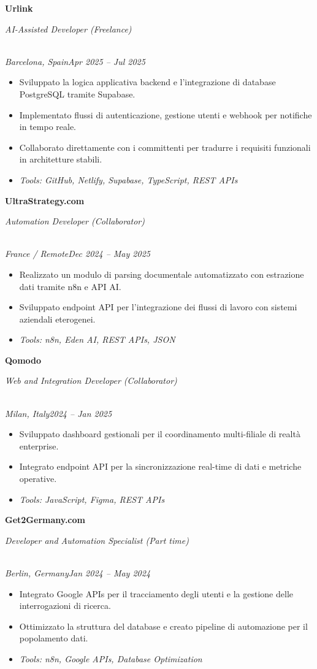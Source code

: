 \documentclass[a4paper,10pt]{article}
\newcommand{\role}[4]{\vspace{3pt}\noindent\hspace{0.6em}\parbox[t]{0.38\textwidth}{\raggedright\textbf{#1}}\hfill\parbox[t]{0.58\textwidth}{\raggedleft\textit{#2}}\\{\textit{#3}\hfill\textit{#4}}\vspace{1pt}}
\begin{document}
\role{Urlink}{AI-Assisted Developer (Freelance)}{Barcelona, Spain}{Apr 2025 -- Jul 2025}
\begin{itemize}
\item Sviluppato la logica applicativa backend e l'integrazione di database PostgreSQL tramite Supabase.
\item Implementato flussi di autenticazione, gestione utenti e webhook per notifiche in tempo reale.
\item Collaborato direttamente con i committenti per tradurre i requisiti funzionali in architetture stabili.
\item \textit{Tools: GitHub, Netlify, Supabase, TypeScript, REST APIs}
\end{itemize}

\newpage
\role{UltraStrategy.com}{Automation Developer (Collaborator)}{France / Remote}{Dec 2024 -- May 2025}
\begin{itemize}
\item Realizzato un modulo di parsing documentale automatizzato con estrazione dati tramite n8n e API AI.
\item Sviluppato endpoint API per l'integrazione dei flussi di lavoro con sistemi aziendali eterogenei.
\item \textit{Tools: n8n, Eden AI, REST APIs, JSON}
\end{itemize}

\role{Qomodo}{Web and Integration Developer (Collaborator)}{Milan, Italy}{2024 -- Jan 2025}
\begin{itemize}
\item Sviluppato dashboard gestionali per il coordinamento multi-filiale di realtà enterprise.
\item Integrato endpoint API per la sincronizzazione real-time di dati e metriche operative.
\item \textit{Tools: JavaScript, Figma, REST APIs}
\end{itemize}

\role{Get2Germany.com}{Developer and Automation Specialist (Part time)}{Berlin, Germany}{Jan 2024 -- May 2024}
\begin{itemize}
\item Integrato Google APIs per il tracciamento degli utenti e la gestione delle interrogazioni di ricerca.
\item Ottimizzato la struttura del database e creato pipeline di automazione per il popolamento dati.
\item \textit{Tools: n8n, Google APIs, Database Optimization}
\end{itemize}
\end{document}
